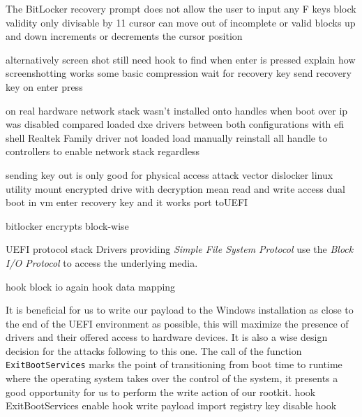 The BitLocker recovery prompt does not allow the user to input any
F keys
block validity
only divisable by 11
\cite[9. BitLocker Key Recovery]{windows-internals-6-part2}
cursor can move out of incomplete or valid blocks
up and down increments or decrements the cursor position

alternatively screen shot
still need hook to find when enter is pressed
explain how screenshotting works
some basic compression
wait for recovery key
send recovery key on enter press

on real hardware
network stack wasn't installed onto handles when boot over ip was disabled
compared loaded dxe drivers between both configurations with efi shell
Realtek Family driver not loaded
load manually
reinstall all handle to controllers to enable network stack regardless

sending key out is only good for physical access attack vector
dislocker linux utility
\cite{dislocker}
mount encrypted drive with decryption mean
read and write access
dual boot in vm
enter recovery key and it works
port to\ac{UEFI}

bitlocker encrypts block-wise

\ac{UEFI} protocol stack
\cite[13.3.2 Partition Disocvery]{uefi-spec}
Drivers providing \emph{Simple File System Protocol} use the \emph{Block I/O Protocol} to access the underlying media.


hook block io
again hook data mapping

It is beneficial for us to write our payload to the Windows installation as close to the end of the \ac{UEFI} environment as possible, this will maximize the presence of drivers and their offered access to hardware devices. It is also a wise design decision for the attacks following to this one. The call of the function \lstinline{ExitBootServices} marks the point of transitioning from boot time to runtime where the operating system takes over the control of the system, it presents a good opportunity for us to perform the write action of our rootkit.
\cite{exitbootservices-hooking}
hook ExitBootServices
enable hook
write payload
import registry key
disable hook

